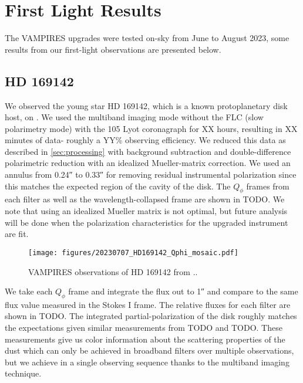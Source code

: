 \section{First Light Results}\label{sec:firstlight}

The VAMPIRES upgrades were tested on-sky from June to August 2023, some results from our first-light observations are presented below.

\subsection{HD 169142\label{sec:hd169142}}

We observed the young star HD 169142, which is a known protoplanetary disk host, on . We used the multiband imaging mode without the FLC (slow polarimetry mode) with the \SI{105}{\mas} Lyot coronagraph for XX hours, resulting in XX minutes of data- roughly a YY\% observing efficiency. We reduced this data as described in \autoref{sec:processing} with background subtraction and double-difference polarimetric reduction with an idealized Mueller-matrix correction. We used an annulus from \ang{;;0.24} to \ang{;;0.33} for removing residual instrumental polarization since this matches the expected region of the cavity of the disk. The $Q_\phi$ frames from each filter as well as the wavelength-collapsed frame are shown in TODO. We note that using an idealized Mueller matrix is not optimal, but future analysis will be done when the polarization characteristics for the upgraded instrument are fit.

\begin{figure*}
    \centering
    \texttt{[image: figures/20230707\_HD169142\_Qphi\_mosaic.pdf]}
    \caption{VAMPIRES observations of HD 169142 from ..\label{fig:hd169142_mosaic}}
\end{figure*}

We take each $Q_\phi$ frame and integrate the flux out to \ang{;;1} and compare to the same flux value measured in the Stokes I frame. The relative fluxes for each filter are shown in TODO. The integrated partial-polarization of the disk roughly matches the expectations given similar measurements from TODO and TODO. These measurements give us color information about the scattering properties of the dust which can only be achieved in broadband filters over multiple observations, but we achieve in a single observing sequence thanks to the multiband imaging technique.

